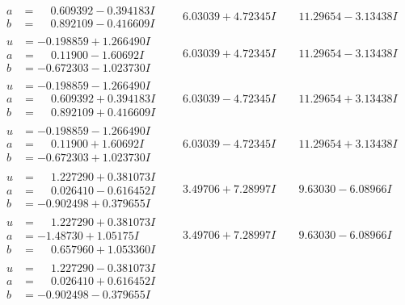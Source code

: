 \documentclass[1p]{elsarticle_modified}
\theoremstyle{definition}
\begin{document}
$$\begin{array}{c|c|c}
\begin{aligned}
a &= \phantom{-}0.609392 - 0.394183 I \\
b &= \phantom{-}0.892109 - 0.416609 I\end{aligned}
 & \phantom{-}6.03039 + 4.72345 I & \phantom{-}11.29654 - 3.13438 I \\ \hline\begin{aligned}
u &= -0.198859 + 1.266490 I \\
a &= \phantom{-}0.11900 - 1.60692 I \\
b &= -0.672303 - 1.023730 I\end{aligned}
 & \phantom{-}6.03039 + 4.72345 I & \phantom{-}11.29654 - 3.13438 I \\ \hline\begin{aligned}
u &= -0.198859 - 1.266490 I \\
a &= \phantom{-}0.609392 + 0.394183 I \\
b &= \phantom{-}0.892109 + 0.416609 I\end{aligned}
 & \phantom{-}6.03039 - 4.72345 I & \phantom{-}11.29654 + 3.13438 I \\ \hline\begin{aligned}
u &= -0.198859 - 1.266490 I \\
a &= \phantom{-}0.11900 + 1.60692 I \\
b &= -0.672303 + 1.023730 I\end{aligned}
 & \phantom{-}6.03039 - 4.72345 I & \phantom{-}11.29654 + 3.13438 I \\ \hline\begin{aligned}
u &= \phantom{-}1.227290 + 0.381073 I \\
a &= \phantom{-}0.026410 - 0.616452 I \\
b &= -0.902498 + 0.379655 I\end{aligned}
 & \phantom{-}3.49706 + 7.28997 I & \phantom{-}9.63030 - 6.08966 I \\ \hline\begin{aligned}
u &= \phantom{-}1.227290 + 0.381073 I \\
a &= -1.48730 + 1.05175 I \\
b &= \phantom{-}0.657960 + 1.053360 I\end{aligned}
 & \phantom{-}3.49706 + 7.28997 I & \phantom{-}9.63030 - 6.08966 I \\ \hline\begin{aligned}
u &= \phantom{-}1.227290 - 0.381073 I \\
a &= \phantom{-}0.026410 + 0.616452 I \\
b &= -0.902498 - 0.379655 I\end{aligned}

\end{array}$$
\end{document}

